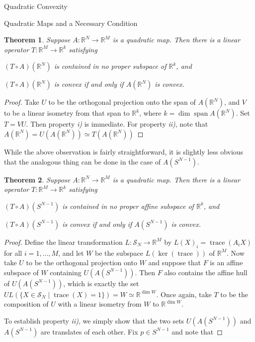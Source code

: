 \documentclass[12pt,oneside,final]{ucthesisucsbmath2010}
\newcommand{\R}{\mathbb{R}}
\newcommand{\s}{\mathcal{S}}
\DeclareMathOperator{\trace}{trace}
\DeclareMathOperator{\kernel}{ker}
\newcounter{qcounter}
\newtheorem{thm}{Theorem}[section]
\theoremstyle{definition}
\begin{document}
\begin{chapter}{Quadratic Convexity}
\begin{section}{Quadratic Maps and a Necessary Condition}
\begin{thm} Suppose $A : \R^N \to \R^M$ is a quadratic map. Then there is a linear operator $T:\R^M\to \R^k$ satisfying
\begin{list}{)}{}
\item $(T \circ A)(\R^N)$ is contained in no proper subspace of $\mathbb{R}^k$, and
\item $(T \circ A)(\R^N)$ is convex if and only if $A(\R^N)$ is convex.
\end{list}
\label{SquashFullD}
\end{thm}
\begin{proof}Take $U$ to be the orthogonal projection onto the span of $A(\R^N)$, and $V$ to be a linear isometry from that span to $\R^k$, where $k = \dim \operatorname{span}A(\R^N)$. Set $T = VU$. Then property \emph{i)} is immediate. For property \emph{ii)}, note that $A(\R^N) = U(A(\R^N))\simeq T(A(\R^N))$
\end{proof}

While the above observation is fairly straightforward, it is slightly less obvious that the analogous thing can be done in the case of $A(S^{N-1})$.

\begin{thm}Suppose $A : \R^N \to \R^M$ is a quadratic map. Then there is a linear operator $T:\R^M\to \R^k$ satisfying
\begin{list}{)}{}
\item $(T \circ A)(S^{N-1})$ is contained in no proper affine subspace of $\mathbb{R}^k$, and
\item $(T \circ A)(S^{N-1})$ is convex if and only if $A(S^{N-1})$ is convex.
\end{list}
\label{SquashCompact}
\end{thm}

\begin{proof} Define the linear transformation $L :\s_N \to \R^M$ by $L(X)_i = \trace(A_iX)$ for all $i = 1,\ldots,M$, and let $W$ be the subspace $L(\kernel(\trace))$ of $\R^M$. Now take $U$ to be the orthogonal projection onto $W$ and suppose that $F$ is an affine subspace of $W$ containing $U(A(S^{N-1}))$. Then $F$ also contains the affine hull of $U(A(S^{N-1}))$, which is exactly the set $UL(\{X \in \s_N \mid \trace(X) = 1\})=W \simeq \R^{\dim W}$. Once again, take $T$ to be the composition of $U$ with a linear isometry from $W$ to $\R^{\dim W}$.

To establish property \emph{ii)}, we simply show that the two sets $U(A(S^{N-1}))$ and $A(S^{N-1})$ are translates of each other. Fix $p \in S^{N-1}$ and note that


\end{proof}
\end{section}
\end{chapter}
\end{document}
